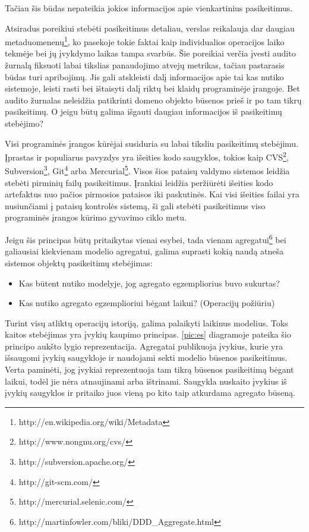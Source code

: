 Tačiau šis būdas nepateikia jokios informacijos apie vienkartinius pasikeitimus.

Atsiradus poreikiui stebėti pasikeitimus detaliau, verslas reikalauja dar daugiau metaduomenenų\footnote{http://en.wikipedia.org/wiki/Metadata}, ko pasekoje tokie faktai kaip individualios operacijos laiko tekmėje bei jų įvykdymo laikas tampa svarbūs. Šie poreikiai verčia įvesti audito žurnalą fiksuoti labai tikslias panaudojimo atvejų metrikas, tačiau pastarasis būdas turi apribojimų. Jis gali atskleisti dalį informacijos apie tai kas nutiko sistemoje, leisti rasti bei ištaisyti dalį riktų bei klaidų programinėje įrangoje. Bet audito žurnalas neleidžia patikrinti domeno objekto būsenos prieš ir po tam tikrų pasikeitimų. O jeigu būtų galima išgauti daugiau informacijos iš pasikeitimų stebėjimo?

Visi programinės įrangos kūrėjai susiduria su labai tiksliu pasikeitimų stebėjimu. Įprastas ir populiarus pavyzdys yra išeities kodo saugyklos, tokios kaip CVS\footnote{http://www.nongnu.org/cvs/}, Subversion\footnote{http://subversion.apache.org/}, Git\footnote{http://git-scm.com/} arba Mercurial\footnote{http://mercurial.selenic.com/}. Visos šios pataisų valdymo sistemos leidžia stebėti pirminių failų pasikeitimus. Įrankiai leidžia peržiūrėti išeities kodo artefaktus nuo pačios pirmosios pataisos iki paskutinės. Kai visi išeities failai yra nusiunčiami į pataisų kontrolės sistemą, ši gali stebėti pasikeitimus viso programinės įrangos kūrimo gyvavimo ciklo metu.

Jeigu šis principas būtų pritaikytas vienai esybei, tada vienam agregatui\footnote{http://martinfowler.com/bliki/DDD\_Aggregate.html} bei galiausiai kiekvienam modelio agregatui, galima suprasti kokią naudą atneša sistemos objektų pasikeitimų stebėjimas:

\begin{itemize}

	\item Kas būtent nutiko modelyje, jog agregato egzempliorius buvo sukurtas?

	\item Kas nutiko agregato egzemplioriui bėgant laikui? (Operacijų požiūriu)

\end{itemize}

Turint visų atliktų operacijų istoriją, galima palaikyti laikinus modelius. Toks kaitos stebėjimas yra įvykių kaupimo principas. \ref{pic:es} diagramoje pateika šio principo aukšto lygio reprezentacija. Agregatai publikuoja įvykius, kurie yra išsaugomi įvykių saugykloje ir naudojami sekti modelio būsenos pasikeitimus. Verta paminėti, jog įvykiai reprezentuoja tam tikrą būsenos pasikeitimą bėgant laikui, todėl jie nėra atnaujinami arba ištrinami. Saugykla nuskaito įvykius iš įvykių saugyklos ir pritaiko juos vieną po kito taip atkurdama agregato būseną. 

